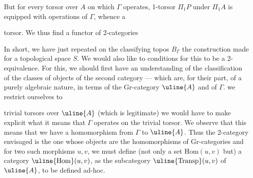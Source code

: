 But for every torsor  over \(A\) on which \(\Gamma\) operates,   1-torsor  \(\Pi_1P\) under \(\Pi_1A\)  is equipped with operations of \(\Gamma\), whence a



 torsor. We thus find a functor of 2-categories

In short, we have just repeated on the classifying topos \(B_\Gamma\) the construction made  for a topological space \(S\). We would also like to  conditions for this   to be a 2-equivalence. For this, we should first have an understanding of the classification of the classes  of objects of the second category --- which are, for their part, of a purely algebraic nature, in terms of the Gr-category \(\uline{A}\) and of \(\Gamma\).  we restrict ourselves to



trivial torsors over \(\uline{A}\) (which is legitimate) we would have to make explicit what it means that \(\Gamma\) operates on the trivial torsor. We observe that this means that we have a homomorphism  from  \(\Gamma\) to \(\uline{A}\). Thus the 2-category envisaged is the one whose objects are the homomorphisms of Gr-categories
and for two such morphisms \(u,v\), we must define (not only a set \(\mathrm{Hom}(u,v)\) but) a category \(\uline{\mathrm{Hom}}(u,v)\), as the subcategory \(\uline{\mathrm{Transp}}(u,v)\) of \(\uline{A}\), to be defined ad-hoc.


